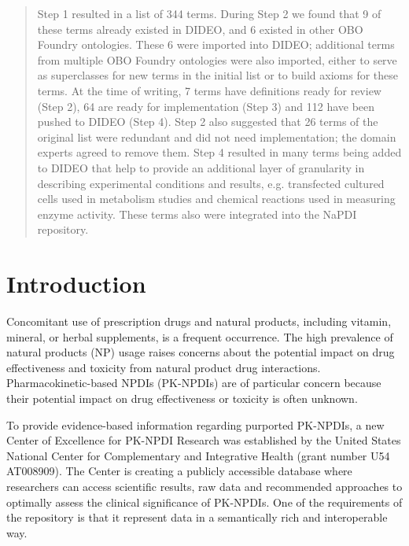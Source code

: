 \documentclass{bmcart}
\begin{document}
\begin{frontmatter}
\begin{abstractbox}
\begin{abstract}
Step 1 resulted in a list of 344 terms. During Step 2 we found that 9 of these terms already existed in DIDEO, and 6 existed in other OBO Foundry ontologies. These 6 were imported into DIDEO; additional terms from multiple OBO Foundry ontologies were also imported, either to serve as superclasses for new terms in the initial list or to build axioms for these terms. At the time of writing, 7 terms have definitions ready for review (Step 2), 64 are ready for implementation (Step 3) and 112 have been pushed to DIDEO (Step 4). Step 2 also suggested that 26 terms of the original list were redundant and did not need implementation; the domain experts agreed to remove them. Step 4 resulted in many terms being added to DIDEO that help to provide an additional layer of granularity in describing experimental conditions and results, e.g. transfected cultured cells used in metabolism studies and chemical reactions used in measuring enzyme activity. These terms also were integrated into the NaPDI repository.
\end{abstract}


\begin{keyword}
\end{keyword}

\end{abstractbox}
\end{frontmatter}

\section*{Introduction}
Concomitant use of prescription drugs and natural products, including vitamin, mineral, or herbal supplements, is a frequent occurrence. The high prevalence of natural products (NP) usage raises concerns about the potential impact on drug effectiveness and toxicity from natural product drug interactions.
Pharmacokinetic-based NPDIs (PK-NPDIs) are of particular concern because their potential impact on drug effectiveness or toxicity is often unknown.

To provide evidence-based information regarding purported PK-NPDIs, a new Center of Excellence for PK-NPDI Research was established by the United States National Center for Complementary and Integrative Health (grant number U54 AT008909).
The Center is creating a publicly accessible database where researchers can access scientific results, raw data and recommended approaches to optimally assess the clinical significance of PK-NPDIs. One of the requirements of the repository is that it represent data in a semantically rich and interoperable way.
\end{document}
